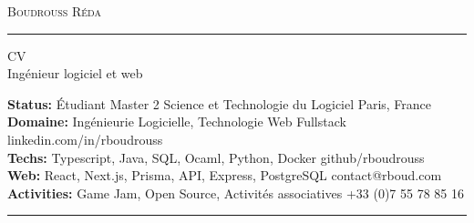 \documentclass[10pt,A4]{article}
\newcommand{\metasection}[2]
{
\footnotesize{#2} \hspace*{\fill} \footnotesize{#1}\\[1pt]
}
\begin{document}
\pagestyle{fancy}	








\vspace{-8pt}
\begin{center}
	\HUGE \textsc{Boudrouss Réda} \textcolor{sectcol}{\rule[-1mm]{1mm}{0.9cm}} \textsc{CV}\\[2pt]
	\small Ingénieur logiciel et web
\end{center}



\vspace{6pt}


\metasection{Paris, France}{\textbf{Status:} Étudiant Master 2 Science et Technologie du Logiciel }
\metasection{linkedin.com/in/rboudrouss}{\textbf{Domaine:} Ingénieurie Logicielle, Technologie Web Fullstack} 
\metasection{github/rboudrouss}{\textbf{Techs:} Typescript, Java, SQL, Ocaml, Python, Docker}
\metasection{contact@rboud.com}{\textbf{Web:} React, Next.js, Prisma, API, Express, PostgreSQL}
\metasection{+33 (0)7 55 78 85 16}{\textbf{Activities:} Game Jam, Open Source, Activités associatives}
\vspace{-2pt}
\textcolor{softcol}{\hrule}
\vspace{6pt}

\normalsize
\end{document}
